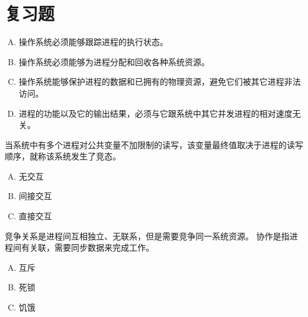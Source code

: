 
\section{复习题}
{
    \begin{reviewc}
        \begin{enumerate}[A.]
            \item 操作系统必须能够跟踪进程的执行状态。
            \item 操作系统必须能够为进程分配和回收各种系统资源。
            \item 操作系统能够保护进程的数据和已拥有的物理资源，避免它们被其它进程非法访问。
            \item 进程的功能以及它的输出结果，必须与它跟系统中其它并发进程的相对速度无关。
        \end{enumerate}
    \end{reviewc}

    \begin{reviewc}

    \end{reviewc}

    \begin{reviewc}
        当系统中有多个进程对公共变量不加限制的读写，该变量最终值取决于进程的读写顺序，就称该系统发生了竞态。
    \end{reviewc}

    \begin{reviewc}
        \begin{enumerate}[A.]
            \item 无交互
            \item 间接交互
            \item 直接交互
        \end{enumerate}
    \end{reviewc}

    \begin{reviewc}
        竞争关系是进程间互相独立、无联系，但是需要竞争同一系统资源。
        协作是指进程间有关联，需要同步数据来完成工作。
    \end{reviewc}

    \begin{reviewc}
        \begin{enumerate}[A.]
            \item 互斥
            \item 死锁
            \item 饥饿
        \end{enumerate}
    \end{reviewc}

}
